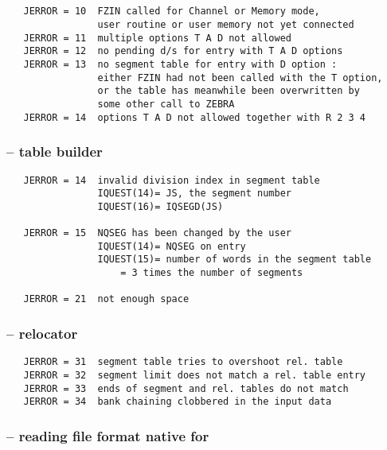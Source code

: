 \subsection*{}

\begin{verbatim}
   JERROR = 10  FZIN called for Channel or Memory mode,
                user routine or user memory not yet connected
   JERROR = 11  multiple options T A D not allowed
   JERROR = 12  no pending d/s for entry with T A D options
   JERROR = 13  no segment table for entry with D option :
                either FZIN had not been called with the T option,
                or the table has meanwhile been overwritten by
                some other call to ZEBRA
   JERROR = 14  options T A D not allowed together with R 2 3 4
\end{verbatim}

\subsubsection*{ -- table builder}

\begin{verbatim}
   JERROR = 14  invalid division index in segment table
                IQUEST(14)= JS, the segment number
                IQUEST(16)= IQSEGD(JS)

   JERROR = 15  NQSEG has been changed by the user
                IQUEST(14)= NQSEG on entry
                IQUEST(15)= number of words in the segment table
                    = 3 times the number of segments

   JERROR = 21  not enough space
\end{verbatim}

\subsubsection*{ -- relocator}

\begin{verbatim}
   JERROR = 31  segment table tries to overshoot rel. table
   JERROR = 32  segment limit does not match a rel. table entry
   JERROR = 33  ends of segment and rel. tables do not match
   JERROR = 34  bank chaining clobbered in the input data
\end{verbatim}

\subsubsection*{ -- reading file format native for }

